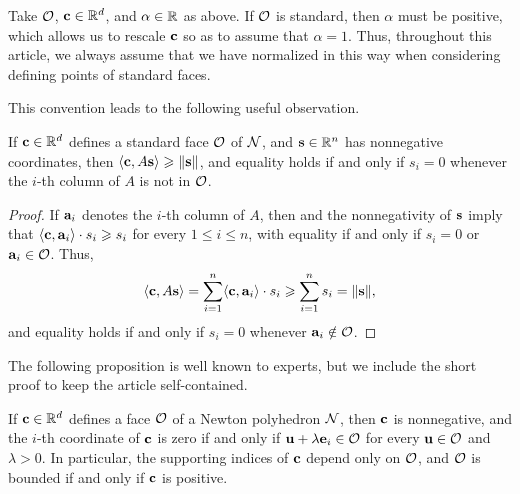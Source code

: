 \documentclass[11pt]{amsart}
\begin{document}
\begin{convention}
\label{alpha=1: convention}
Take $\mathcal{O}$, $\mathbf{c} \in \mathbb{R}^d$, and $\alpha \in \mathbb{R}$ as above.  If $\mathcal{O}$ is standard, then $\alpha$ must be positive, which allows us to rescale $\mathbf{c}$ so as to assume that $\alpha = 1$.   Thus, throughout this article, we always assume that we have normalized in this way when considering defining points of standard faces.
\end{convention}

This convention leads to the following useful observation.


\begin{proposition}\label{prop: inner product with columns of A}
   If $\mathbf{c} \in \mathbb{R}^d$ defines a standard face $\mathcal{O}$ of $\mathcal{N}$, and $\mathbf{s} \in \mathbb{R}^n$ has nonnegative coordinates, then $\langle \mathbf{c}, A\mathbf{s} \rangle \geqslant \| \mathbf{s} \|$,  and equality holds if and only if $s_i = 0$ whenever the $i$-th column of $A$ is not in $\mathcal{O}$.
\end{proposition}

\begin{proof}
If $\mathbf{a}_i$ denotes the $i$-th column of $A$, then  and the nonnegativity of $\mathbf{s}$ imply that $\langle \mathbf{c}, \mathbf{a}_i \rangle \cdot s_i \geqslant s_i$ for every $1 \leq i \leq n$, with equality if and only if $s_i = 0$ or $\mathbf{a}_i \in \mathcal{O}$.
Thus,
\[ \langle \mathbf{c}, A\mathbf{s} \rangle = \sum_{i=1}^n \langle \mathbf{c}, \mathbf{a}_i \rangle \cdot s_i \geqslant  \sum_{i=1}^n s_i  = \| \mathbf{s} \|,\]
and equality holds if and only if $s_i = 0$ whenever $\mathbf{a}_i \notin \mathcal{O}$.
\end{proof}

The following proposition is well known to experts, but we include the short proof to keep the article self-contained.

\begin{proposition}
   \label{face: P}
   If $\mathbf{c} \in \mathbb{R}^d$ defines a face $\mathcal{O}$ of a Newton polyhedron $\mathcal{N}$, then $\mathbf{c}$ is nonnegative, and the $i$-th coordinate of $\mathbf{c}$ is zero if and only if $\mathbf{u} + \lambda \mathbf{e}_i \in \mathcal{O}$  for every $\mathbf{u} \in \mathcal{O}$ and $\lambda > 0$.
   In particular, the supporting indices of $\mathbf{c}$ depend only on $\mathcal{O}$, and $\mathcal{O}$ is bounded if and only if $\mathbf{c}$ is positive.
\end{proposition}
\end{document}
